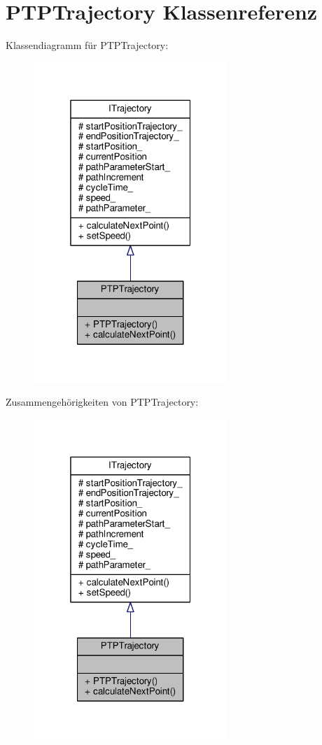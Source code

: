 \hypertarget{classPTPTrajectory}{\section{P\-T\-P\-Trajectory Klassenreferenz}
\label{classPTPTrajectory}
}


Klassendiagramm für P\-T\-P\-Trajectory\-:
\nopagebreak
\begin{figure}[H]
\begin{center}
\leavevmode
\includegraphics[width=208pt]{classPTPTrajectory__inherit__graph}
\end{center}
\end{figure}


Zusammengehörigkeiten von P\-T\-P\-Trajectory\-:
\nopagebreak
\begin{figure}[H]
\begin{center}
\leavevmode
\includegraphics[width=208pt]{classPTPTrajectory__coll__graph}
\end{center}
\end{figure}
